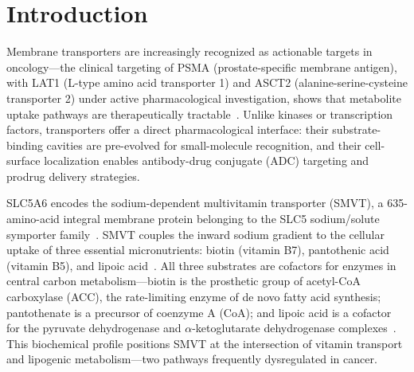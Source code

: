 \documentclass[pdflatex,sn-nature]{sn-jnl}
\begin{document}
\maketitle


\section*{Introduction}

Membrane transporters are increasingly recognized as actionable targets in oncology---the clinical targeting of PSMA (prostate-specific membrane antigen), with LAT1 (L-type amino acid transporter 1) and ASCT2 (alanine-serine-cysteine transporter 2) under active pharmacological investigation, shows that metabolite uptake pathways are therapeutically tractable~\cite{hofman2020,kanai1998,geldermalsen2016}. Unlike kinases or transcription factors, transporters offer a direct pharmacological interface: their substrate-binding cavities are pre-evolved for small-molecule recognition, and their cell-surface localization enables antibody-drug conjugate (ADC) targeting and prodrug delivery strategies.

SLC5A6 encodes the sodium-dependent multivitamin transporter (SMVT), a 635-amino-acid integral membrane protein belonging to the SLC5 sodium/solute symporter family~\cite{prasad1998}. SMVT couples the inward sodium gradient to the cellular uptake of three essential micronutrients: biotin (vitamin B7), pantothenic acid (vitamin B5), and lipoic acid~\cite{wang1999}. All three substrates are cofactors for enzymes in central carbon metabolism---biotin is the prosthetic group of acetyl-CoA carboxylase (ACC), the rate-limiting enzyme of de novo fatty acid synthesis; pantothenate is a precursor of coenzyme A (CoA); and lipoic acid is a cofactor for the pyruvate dehydrogenase and $\alpha$-ketoglutarate dehydrogenase complexes~\cite{tong2005,leonardi2007}. This biochemical profile positions SMVT at the intersection of vitamin transport and lipogenic metabolism---two pathways frequently dysregulated in cancer.
\end{document}
